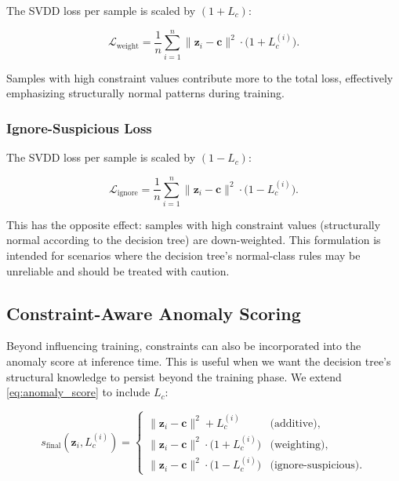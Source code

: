 The SVDD loss per sample is scaled by $(1 + L_c)$:

\begin{equation}
\mathcal{L}_{\text{weight}} = \frac{1}{n} \sum_{i=1}^{n} \| \mathbf{z}_i - \mathbf{c} \|^2 \cdot \bigl(1 + L_c^{(i)}\bigr).
\label{eq:loss_weight}
\end{equation}

Samples with high constraint values contribute more to the total loss, effectively emphasizing structurally normal patterns during training.

\subsubsection{Ignore-Suspicious Loss}

The SVDD loss per sample is scaled by $(1 - L_c)$:

\begin{equation}
\mathcal{L}_{\text{ignore}} = \frac{1}{n} \sum_{i=1}^{n} \| \mathbf{z}_i - \mathbf{c} \|^2 \cdot \bigl(1 - L_c^{(i)}\bigr).
\label{eq:loss_ignore}
\end{equation}

This has the opposite effect: samples with high constraint values (structurally normal according to the decision tree) are down-weighted. This formulation is intended for scenarios where the decision tree's normal-class rules may be unreliable and should be treated with caution.

\subsection{Constraint-Aware Anomaly Scoring}
\label{sec:constrained_scoring}

Beyond influencing training, constraints can also be incorporated into the anomaly score at inference time. This is useful when we want the decision tree's structural knowledge to persist beyond the training phase. We extend \eqref{eq:anomaly_score} to include $L_c$:

\begin{equation}
s_{\text{final}}(\mathbf{z}_i, L_c^{(i)}) = \begin{cases}
\|\mathbf{z}_i - \mathbf{c}\|^2 + L_c^{(i)} & \text{(additive)}, \\[4pt]
\|\mathbf{z}_i - \mathbf{c}\|^2 \cdot \bigl(1 + L_c^{(i)}\bigr) & \text{(weighting)}, \\[4pt]
\|\mathbf{z}_i - \mathbf{c}\|^2 \cdot \bigl(1 - L_c^{(i)}\bigr) & \text{(ignore-suspicious)}.
\end{cases}
\label{eq:forecast_score}
\end{equation}

